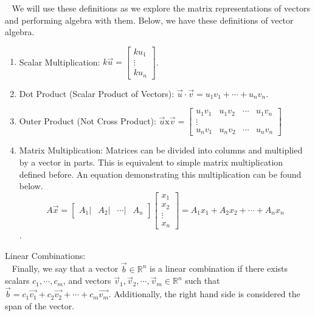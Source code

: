 \documentclass[12pt]{article}
\begin{document}
$\,\,\,$ We will use these definitions as we explore the matrix representations of vectors and performing algebra with them. Below, we have these definitions of vector algebra.
\begin{enumerate}
\item Scalar Multiplication: $k\vec{u}=\begin{bmatrix}ku_1\\ \vdots\\ku_n \end{bmatrix}$.
\item Dot Product (Scalar Product of Vectors): $\vec{u}\cdot\vec{v}=u_1v_1+\cdots +u_nv_n$.
\item Outer Product (Not Cross Product): $\vec{u}\text{x}\vec{v}=\begin{bmatrix}u_1v_1 & u_1v_2 & \cdots & u_1v_n\\
\vdots\\
u_nv_1 & u_nv_2 & \cdots & u_nv_n
\end{bmatrix}$
\item Matrix Multiplication: Matrices can be divided into columns and multiplied by a vector in parts. This is equivalent to simple matrix multiplication defined before. An equation demonstrating this multiplication can be found below. $$A\vec{x}=\begin{bmatrix}\!\left. A_1 \right| & \left. \!\!\!\! A_2 \right| & \!\!\!\! \left. \cdots \right| & \!\!\!\! A_n\end{bmatrix}\begin{bmatrix}x_1\\ x_2\\ \vdots\\ x_n\end{bmatrix}=A_1x_1+A_2x_2+\cdots+A_nx_n$$.
\end{enumerate}

Linear Combinations:\\

$\,\,\,$ Finally, we say that a vector $\vec{b}\in\mathbb{R}^n$ is a linear combination if there exists scalars $c_1,\cdots,c_m$, and vectors $\vec{v}_1,\vec{v}_2,\cdots,\vec{v}_m\in\mathbb{R}^n$ such that $\vec{b}=c_1\vec{v_1}+c_2\vec{v_2}+\cdots+c_m\vec{v_m}$. Additionally, the right hand side is considered the span of the vector.
\end{document}
